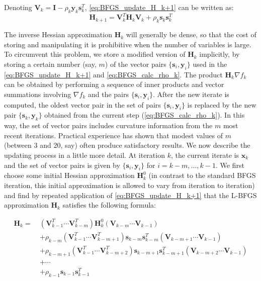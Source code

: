 Denoting $\textbf{V}_k = \textbf{I} - \rho_k\textbf{y}_k\textbf{s}_k^T$, \cref{eq:BFGS_update_H_k+1} can be written as:
\begin{equation}
  \textbf{H}_{k+1} = \textbf{V}_k^T \textbf{H}_{k} \textbf{V}_k +\rho_k\textbf{s}_k\textbf{s}_k^T
\end{equation}

The inverse Hessian approximation $\textbf{H}_{k}$ will generally be dense, so that the cost of storing and manipulating it is prohibitive when the number of variables is large. To circumvent this problem, we store a modified version of $\textbf{H}_{k}$ implicitly, by storing a certain number (say, $m$) of the vector pairs $\{\textbf{s}_i, \textbf{y}_i\}$ used in the \cref{eq:BFGS_update_H_k+1} and \cref{eq:BFGS_calc_rho_k}. The product $\textbf{H}_{k} \nabla f_k$ can be obtained by performing a sequence of inner products and vector summations involving $\nabla f_k$ and the pairs $\{\textbf{s}_i, \textbf{y}_i\}$. After the new iterate is computed, the oldest vector pair in the set of pairs $\{\textbf{s}_i, \textbf{y}_i\}$ is replaced by the new pair $\{\textbf{s}_k, \textbf{y}_k\}$ obtained from the current step (\cref{eq:BFGS_calc_rho_k}). In this way, the set of vector pairs includes curvature information from the $m$ most recent iterations. Practical experience has shown that modest values of $m$ (between 3 and 20, say) often produce satisfactory results. We now describe the updating process in a little more detail. At iteration $k$, the current iterate is $\textbf{x}_k$ and the set of vector pairs is given by $\{\textbf{s}_i, \textbf{y}_i\}$ for $i=k-m,\ldots,k-1$. We first choose some initial Hessian approximation $\textbf{H}_{k}^0$ (in contrast to the standard BFGS iteration, this initial approximation is allowed to vary from iteration to iteration) and find by repeated application of \cref{eq:BFGS_update_H_k+1} that the L-BFGS approximation $\textbf{H}_{k}$ satisfies the following formula: \cite{Nocedal2006}

\begin{align}
  \textbf{H}_{k} =\  & (\textbf{V}_{k-1}^T \cdots \textbf{V}_{k-m}^T) \textbf{H}_{k}^0 (\textbf{V}_{k-m} \cdots \textbf{V}_{k-1})                                  \nonumber          \\
                     & + \rho_{k-m} (\textbf{V}_{k-1}^T \cdots \textbf{V}_{k-m+1}^T) \textbf{s}_{k-m} \textbf{s}_{k-m}^T (\textbf{V}_{k-m+1} \cdots \textbf{V}_{k-1}) \nonumber       \\
                     & + \rho_{k-m+1} (\textbf{V}_{k-1}^T \cdots \textbf{V}_{k-m+2}^T) \textbf{s}_{k-m+1} \textbf{s}_{k-m+1}^T (\textbf{V}_{k-m+2} \cdots \textbf{V}_{k-1}) \nonumber \\
                     & + \cdots \nonumber                                                                                                                                             \\
                     & + \rho_{k-1} \textbf{s}_{k-1} \textbf{s}_{k-1}^T
\end{align}

